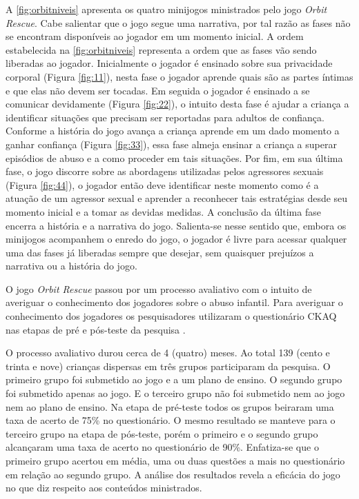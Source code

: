 A \autoref{fig:orbitniveis} apresenta os quatro minijogos ministrados pelo jogo \textit{Orbit Rescue}. Cabe salientar que o jogo segue uma narrativa, por tal razão as fases não se encontram disponíveis ao jogador em um momento inicial. A ordem estabelecida na \autoref{fig:orbitniveis} representa a ordem que as fases vão sendo liberadas ao jogador. Inicialmente o jogador é ensinado sobre sua privacidade corporal (Figura \ref{fig:11}), nesta fase o jogador aprende quais são as partes íntimas e que elas não devem ser tocadas. Em seguida o jogador é ensinado a se comunicar devidamente (Figura \ref{fig:22}), o intuito desta fase é ajudar a criança a identificar situações que precisam ser reportadas para adultos de confiança. Conforme a história do jogo avança a criança aprende em um dado momento a ganhar confiança (Figura \ref{fig:33}), essa fase almeja ensinar a criança a superar episódios de abuso e a como proceder em tais situações. Por fim, em sua última fase, o jogo discorre sobre as abordagens utilizadas pelos agressores sexuais (Figura \ref{fig:44}), o jogador então deve identificar neste momento como é a atuação de um agressor sexual e aprender a reconhecer tais estratégias desde seu momento inicial e a tomar as devidas medidas. A conclusão da última fase encerra a história e a narrativa do jogo. Salienta-se nesse sentido que, embora os minijogos acompanhem o enredo do jogo, o jogador é livre para acessar qualquer uma das fases já liberadas sempre que desejar, sem quaisquer prejuízos a narrativa ou a história do jogo. 

O jogo \textit{Orbit Rescue} passou por um processo avaliativo com o intuito de averiguar o conhecimento dos jogadores sobre o abuso infantil. Para averiguar o conhecimento dos jogadores os pesquisadores utilizaram o questionário \ac{CKAQ} nas etapas de pré e pós-teste da pesquisa \cite{jones2020serious}.

O processo avaliativo durou cerca de 4 (quatro) meses. Ao total 139 (cento e trinta e nove) crianças dispersas em três grupos participaram da pesquisa. O primeiro grupo foi submetido ao jogo e a um plano de ensino. O segundo grupo foi submetido apenas ao jogo. E o terceiro grupo não foi submetido nem ao jogo nem ao plano de ensino. Na etapa de pré-teste todos os grupos beiraram uma taxa de acerto de 75\% no questionário. O mesmo resultado se manteve para o terceiro grupo na etapa de pós-teste, porém o primeiro e o segundo grupo alcançaram uma taxa de acerto no questionário de 90\%. Enfatiza-se que o primeiro grupo acertou em média, uma ou duas questões a mais no questionário em relação ao segundo grupo. A análise dos resultados revela a eficácia do jogo no que diz respeito aos conteúdos ministrados.

